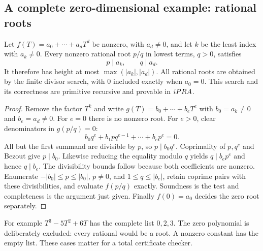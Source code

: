 \subsection{A complete zero-dimensional example: rational roots}

\begin{theorem}\label{thm:roots}
Let $f(T)=a_0+\cdots+a_dT^d$ be nonzero, with $a_d\ne0$, and let
$k$ be the least index with $a_k\ne0$. Every nonzero rational root $p/q$
in lowest terms, $q>0$, satisfies
\[
                  p\mid a_k,\qquad q\mid a_d.
\]
It therefore has height at most $\max(|a_k|,|a_d|)$. All rational roots
are obtained by the finite divisor search, with $0$ included exactly when
$a_0=0$. This search and its correctness are primitive recursive and
provable in $iPRA$.
\end{theorem}
\begin{proof}
Remove the factor $T^k$ and write $g(T)=b_0+\cdots+b_eT^e$ with
$b_0=a_k\ne0$ and $b_e=a_d\ne0$. For $e=0$ there is no nonzero root.
For $e>0$, clear denominators in $g(p/q)=0$:
\[
       b_0q^e+b_1pq^{e-1}+\cdots+b_ep^e=0.
\]
All but the first summand are divisible by $p$, so $p\mid b_0q^e$.
Coprimality of $p,q^e$ and Bezout give $p\mid b_0$. Likewise reducing
the equality modulo $q$ yields $q\mid b_ep^e$ and hence $q\mid b_e$.
The divisibility bounds follow because both coefficients are nonzero.
Enumerate $-|b_0|\le p\le|b_0|$, $p\ne0$, and
$1\le q\le|b_e|$, retain coprime pairs with these divisibilities, and
evaluate $f(p/q)$ exactly. Soundness is the test and completeness is the
argument just given. Finally $f(0)=a_0$ decides the zero root separately.
\end{proof}

For example $T^3-5T^2+6T$ has the complete list $0,2,3$. The zero
polynomial is deliberately excluded: every rational would be a root. A
nonzero constant has the empty list. These cases matter for a total
certificate checker.
